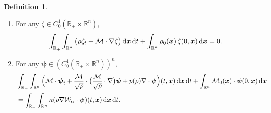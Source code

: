 \documentclass[reqno,11pt]{amsart}
\numberwithin{equation}{section}
\theoremstyle{definition}
\newtheorem{definition}[theorem]{Definition}
\def\dd{{\, \rm d}}
\def\M{{\mathcal{M}}}
\begin{document}
\begin{definition}
\begin{enumerate}
\smallskip
\begin{itemize}
 \item For $\kappa = -1$,
\begin{equation*}
 \int_{\mathbb{R}^n} \Big( \frac{1}{2} \Big| \frac{\M}{\sqrt{\rho}}\Big|^2
 + \rho e(\rho) - \frac{1}{2} \rho (\Phi_\alpha * \rho) \Big)(t,\boldsymbol{x})
 \dd \boldsymbol{x} \leq E_0.
\end{equation*}
\item For $\kappa = 1$,
\begin{align*}
\begin{cases}
\displaystyle
\int_{\mathbb{R}^n} \Big( \frac{1}{2} \Big| \frac{\M}{\sqrt{\rho}}\Big|^2
+ \rho e(\rho) - \frac{1}{2} \rho (\Phi_\alpha * \rho) \Big)(t,\boldsymbol{x})
\dd \boldsymbol{x} \leq C(E_0,M), \\[4mm]
\displaystyle
\int_{\mathbb{R}^n} \Big( \frac{1}{2}\Big|\frac{\M}{\sqrt{\rho}}\Big|^2
+ \rho e(\rho) + \frac{1}{2} \rho (\Phi_\alpha * \rho) \Big)(t,\boldsymbol{x})
\dd \boldsymbol{x} \leq E_0.
\end{cases}
\end{align*}
\end{itemize}
\item[(c)] For any $\zeta \in C^1_0(\mathbb{R}_+ \times \mathbb{R}^n)$,
\begin{equation*}
\int_{\mathbb{R}_+} \int_{\mathbb{R}^n} \big(\rho \zeta_t
+ \M \cdot \nabla \zeta\big) \dd \boldsymbol{x} \dd t
+ \int_{\mathbb{R}^n} \rho_0(\boldsymbol{x})\,\zeta(0,\boldsymbol{x}) \dd \boldsymbol{x} = 0.
\end{equation*}
\item[(d)] For any $\boldsymbol{\psi} \in (C^1_0(\mathbb{R}_+ \times \mathbb{R}^n))^n$,
    \begin{align*}
 & \int_{\mathbb{R}_+} \int_{\mathbb{R}^n}
  \Big(\M \cdot \boldsymbol{\psi}_t
 + \frac{\M}{\sqrt{\rho}} \cdot \big( \frac{\M}{\sqrt{\rho}} \cdot \nabla \big)
 \boldsymbol{\psi} + p(\rho)\nabla \cdot \boldsymbol{\psi} \Big)(t,\boldsymbol{x})
 \dd \boldsymbol{x} \dd t
  + \int_{\mathbb{R}^n} \M_0(\boldsymbol{x}) \cdot \boldsymbol{\psi}(0,\boldsymbol{x}) \dd \boldsymbol{x} \\
  & = \int_{\mathbb{R}_+} \int_{\mathbb{R}^n} \kappa(\rho \nabla \mathcal{W}_\alpha \cdot \boldsymbol{\psi})(t,\boldsymbol{x}) \dd \boldsymbol{x} \dd t.
    \end{align*}
\end{enumerate}
\end{definition}
\end{document}
